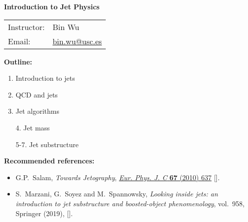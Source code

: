 \documentclass[9pt,a4paper,unknownkeysallowed,xcolor=dvipsnames,aspectratio=43]{beamer}
\begin{document}
\begin{frame}
\vspace*{\fill}
\begin{center}
{\Huge\bf\color{darkred} Introduction to Jet Physics}\\
\vspace{4mm}
\begin{tabular}{ l l }
 Instructor: & Bin Wu\\ 
 Email: & \href{mailto:bin.wu@usc.es}{bin.wu@usc.es}   
\end{tabular}
\end{center}
\vspace{2mm}

{\bf Outline:}
\vspace{2mm}
\begin{enumerate}
    \item Introduction to jets
    \item QCD and jets
    \item Jet algorithms
    \item[4.] Jet mass
    \item[5-7.] Jet substructure
\end{enumerate}
\vspace{2mm}
{\bf Recommended references:}
\vspace{2mm}
\begin{itemize}
    \item G.P.~Salam, \emph{{Towards Jetography}},
  \href{https://doi.org/10.1140/epjc/s10052-010-1314-6}{\emph{Eur. Phys. J. C}
  {\bfseries 67} (2010) 637} [\href{https://arxiv.org/abs/0906.1833}{{}}].
\vspace{2mm}
    \item S.~Marzani, G.~Soyez and M.~Spannowsky, \emph{{Looking inside jets: an
  introduction to jet substructure and boosted-object phenomenology}},
  vol.~958, Springer (2019),
  [\href{https://arxiv.org/abs/1901.10342}{{}}].
\end{itemize}
\vspace*{\fill}
\end{frame}
\end{document}

